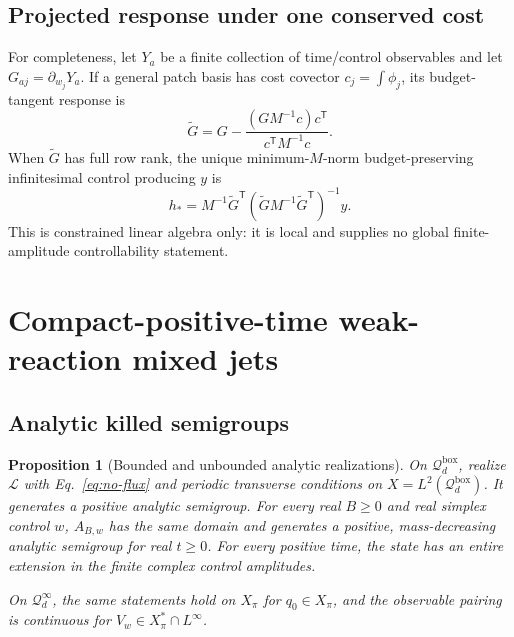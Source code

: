 \documentclass[aps,physrev,onecolumn,amsmath,amssymb,longbibliography]{revtex4-2}
\newcommand{\Lfree}{\mathcal L}
\newcommand{\Qbox}{\mathcal Q_d^{\mathrm{box}}}
\newcommand{\Qinf}{\mathcal Q_d^{\infty}}
\newtheorem{proposition}[theorem]{Proposition}
\begin{document}
\subsection{Projected response under one conserved cost}

For completeness, let \(Y_a\) be a finite collection of time/control
observables and let \(G_{aj}=\partial_{w_j}Y_a\).  If a general patch basis has
cost covector \(c_j=\int\phi_j\), its budget-tangent response is
\begin{equation}
 \widetilde G=G-
 \frac{(GM^{-1}c)c^{\mathsf T}}{c^{\mathsf T}M^{-1}c}.
 \label{eq:projected-response}
\end{equation}
When \(\widetilde G\) has full row rank, the unique minimum-\(M\)-norm
budget-preserving infinitesimal control producing \(y\) is
\begin{equation}
 h_*=M^{-1}\widetilde G^{\mathsf T}
 (\widetilde GM^{-1}\widetilde G^{\mathsf T})^{-1}y.
 \label{eq:minimum-norm-control}
\end{equation}
This is constrained linear algebra only: it is local and supplies no global
finite-amplitude controllability statement.

\section{Compact-positive-time weak-reaction mixed jets}
\label{sec:weak-bridge}

\subsection{Analytic killed semigroups}

\begin{proposition}[Bounded and unbounded analytic realizations]
\label{prop:analytic-semigroup}
On \(\Qbox\), realize \(\Lfree\) with Eq.~\eqref{eq:no-flux} and periodic
transverse conditions on \(X=L^2(\Qbox)\).  It generates a positive analytic
semigroup.  For every real \(B\ge0\) and real simplex control \(w\),
\(A_{B,w}\) has the same domain and generates a positive, mass-decreasing
analytic semigroup for real \(t\ge0\).  For every positive time, the state has
an entire extension in the finite complex control amplitudes.

On \(\Qinf\), the same statements hold on \(X_\pi\) for
\(q_0\in X_\pi\), and the observable pairing is continuous for
\(V_w\in X_\pi^*\cap L^\infty\).
\end{proposition}
\end{document}
